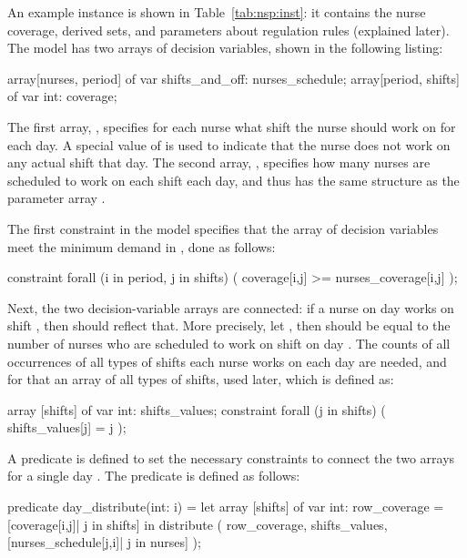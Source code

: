 \documentclass[a4paper,12pt]{article}
\begin{document}
An example instance is shown in Table~\ref{tab:nsp:inst}: it contains the nurse coverage, derived sets,
and parameters about regulation rules (explained later).
The model has two arrays of decision variables, shown in the following listing:
\begin{mznnobreak}
array[nurses, period] of var shifts_and_off: nurses_schedule;
array[period, shifts] of var int: coverage;
\end{mznnobreak}
%
\begin{sloppypar}
The first array, , specifies for each nurse what shift the
nurse should work on for each day. A special value of  is used to indicate that the
nurse does not work on any actual shift that day. The second array, , specifies how
many nurses are scheduled to work on each shift each day, and thus has the same structure
as the parameter array .
\end{sloppypar}

The first constraint in the model specifies that 
the array of decision variables  meet the minimum demand in , done as follows:
\begin{mznnobreak}
constraint forall (i in period, j in shifts) (
   coverage[i,j] >= nurses_coverage[i,j]
);
\end{mznnobreak}

Next, the two decision-variable arrays are connected: if a nurse  on day  works on
shift , then  should reflect that. More precisely,
let , then  should be equal to the number 
of nurses who are scheduled to work on shift  on day .
The counts of all occurrences of all types of shifts each nurse works on each day are needed,
and for that an array of all types of shifts, used later,
which is defined as:
\begin{mznnobreak}
array [shifts] of var int: shifts_values;
constraint forall (j in shifts) (
  shifts_values[j] = j
);
\end{mznnobreak}

A predicate  is defined to set the necessary constraints to connect the
two arrays for a single day . 
The predicate is defined as follows:
\begin{mznnobreak}
predicate day_distribute(int: i) = let {
  array [shifts] of var int: row_coverage =
    [coverage[i,j]| j in shifts]
  }
  in distribute (
    row_coverage,
    shifts_values,
    [nurses_schedule[j,i]| j in nurses]
    );
\end{mznnobreak}
\end{document}
